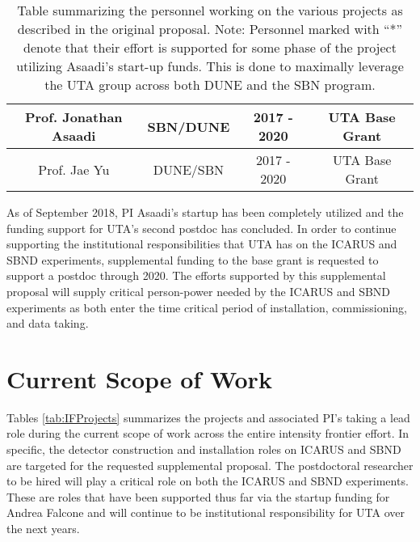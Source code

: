 \begin{table}[htb]
\begin{center}
{\begin{tabular}{c|c|c|c}
    
    Prof. Jonathan Asaadi & SBN/DUNE & 2017 - 2020 & UTA Base Grant \\
     \hline
    Prof. Jae Yu & DUNE/SBN & 2017 - 2020 & UTA Base Grant \\
     \hline
    \end{tabular}}
    \caption{Table summarizing the personnel working on the various projects as described in the original proposal. Note: Personnel marked with ``*'' denote that their effort is supported for some phase of the project utilizing Asaadi's start-up funds. This is done to maximally leverage the UTA group across both DUNE and the SBN program.} \label{tab:People}
    \end{center}
\end{table}

As of September 2018, PI Asaadi's startup has been completely utilized and the funding support for UTA's second postdoc has concluded. In order to continue supporting the institutional responsibilities that UTA has on the ICARUS and SBND experiments, supplemental funding to the base grant is requested to support a postdoc through 2020. The efforts supported by this supplemental proposal will supply critical person-power needed by the ICARUS and SBND experiments as both enter the time critical period of installation, commissioning, and data taking. 


\section*{Current Scope of Work}

Tables \ref{tab:IFProjects} summarizes the projects and associated PI's taking a lead role during the current scope of work across the entire intensity frontier effort. In specific, the detector construction and installation roles on ICARUS and SBND are targeted for the requested supplemental proposal. The postdoctoral researcher to be hired will play a critical role on both the ICARUS and SBND experiments. These are roles that have been supported thus far via the startup funding for Andrea Falcone and will continue to be institutional responsibility for UTA over the next years.

